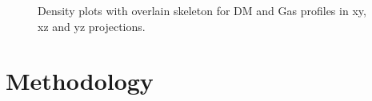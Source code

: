 \documentclass[journal]{IEEEtran}
\begin{document}
\begin{figure}[!t]

\label{fig:densities}
\caption{Density plots with overlain skeleton for DM and Gas profiles in xy, xz and yz projections.}
\end{figure}

\section{Methodology}
\end{document}
